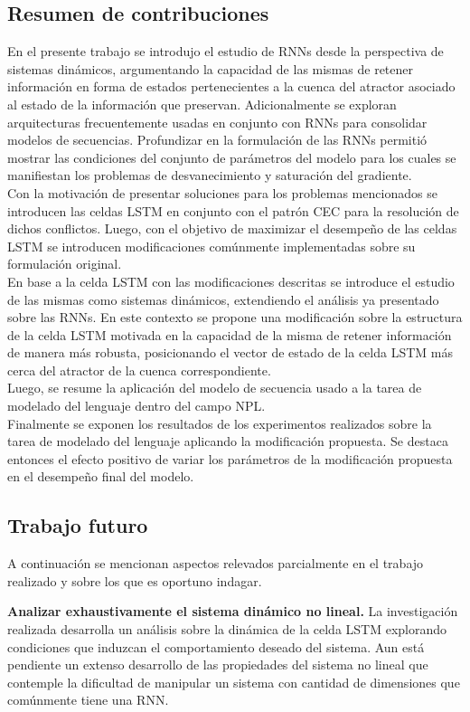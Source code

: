 \documentclass{article}
\begin{document}
	\subsection{Resumen de contribuciones}
	En el presente trabajo se introdujo el estudio de RNNs desde la perspectiva de sistemas dinámicos, argumentando la capacidad de las mismas de retener información en forma de estados pertenecientes a la cuenca del atractor asociado al estado de la información que preservan. Adicionalmente se exploran arquitecturas frecuentemente usadas en conjunto con RNNs para consolidar modelos de secuencias. Profundizar en la formulación de las RNNs permitió mostrar las condiciones del conjunto de parámetros del modelo para los cuales se manifiestan los problemas de desvanecimiento y saturación del gradiente.\\
	Con la motivación de presentar soluciones para los problemas mencionados se introducen las celdas LSTM en conjunto con el patrón CEC para la resolución de dichos conflictos. Luego, con el objetivo de maximizar el desempeño de las celdas LSTM se introducen modificaciones comúnmente implementadas sobre su formulación original.\\
	En base a la celda LSTM con las modificaciones descritas se introduce el estudio de las mismas como sistemas dinámicos, extendiendo el análisis ya presentado sobre las RNNs. En este contexto se propone una modificación sobre la estructura de la celda LSTM motivada en la capacidad de la misma de retener información de manera más robusta, posicionando el vector de estado de la celda LSTM más cerca del atractor de la cuenca correspondiente.\\
	Luego, se resume la aplicación del modelo de secuencia usado a la tarea de modelado del lenguaje dentro del campo NPL.\\
	Finalmente se exponen los resultados de los experimentos realizados sobre la tarea de modelado del lenguaje aplicando la modificación propuesta. Se destaca entonces el efecto positivo de variar los parámetros de la modificación propuesta en el desempeño final del modelo.\\
	
	\subsection{Trabajo futuro}
	A continuación se mencionan aspectos relevados parcialmente en el trabajo realizado y sobre los que es oportuno indagar.
	
	\textbf{Analizar exhaustivamente el sistema dinámico no lineal.} La investigación realizada desarrolla un análisis sobre la dinámica de la celda LSTM explorando condiciones que induzcan el comportamiento deseado del sistema. Aun está pendiente un extenso desarrollo de las propiedades del sistema no lineal que contemple la dificultad de manipular un sistema con cantidad de dimensiones que comúnmente tiene una RNN.\\
	
\end{document}
